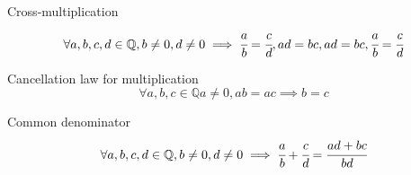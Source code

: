 \begin{rational}
Cross-multiplication
\[
\forall a, b, c, d \in \mathbb{Q}, b \neq 0, d \neq 0 \implies \cfrac{a}{b} = \cfrac{c}{d}, ad = bc, ad = bc, \cfrac{a}{b} = \cfrac{c}{d}
\]
\end{rational}
\begin{rational}
Cancellation law for multiplication
\[
\forall a, b, c \in \mathbb{Q} a \neq 0, ab = ac \implies b = c
\]
\end{rational}
\begin{rational}
Common denominator
\[
\forall a, b, c, d \in \mathbb{Q}, b \neq 0, d \neq 0 \implies \cfrac{a}{b} + \cfrac{c}{d} = \cfrac{ad + bc}{bd}
\]
\end{rational}
